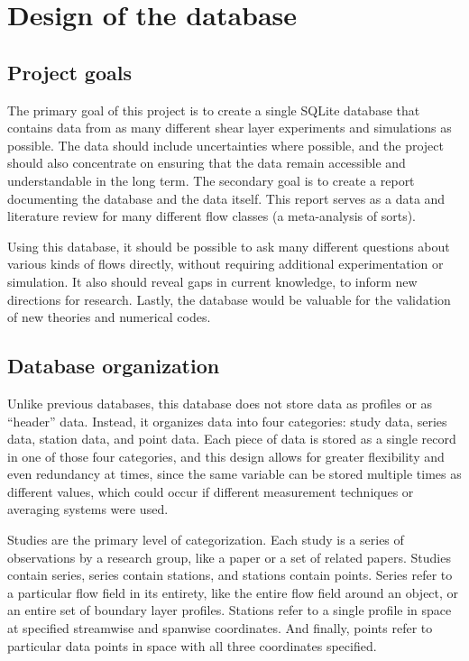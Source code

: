 %
\chapter{Design of the database}


\section{Project goals}

The primary goal of this project is to create a single SQLite database that
contains data from as many different shear layer experiments and simulations as
possible.  The data should include uncertainties where possible, and the
project should also concentrate on ensuring that the data remain accessible and
understandable in the long term.  The secondary goal is to create a report
documenting the database and the data itself.  This report serves as a data and
literature review for many different flow classes (a meta-analysis of sorts).

Using this database, it should be possible to ask many different questions
about various kinds of flows directly, without requiring additional
experimentation or simulation.  It also should reveal gaps in current
knowledge, to inform new directions for research.  Lastly, the database would
be valuable for the validation of new theories and numerical codes.


\section{Database organization}

Unlike previous databases, this database does not store data as profiles or as
``header'' data.  Instead, it organizes data into four categories: study data,
series data, station data, and point data.  Each piece of data is stored as a
single record in one of those four categories, and this design allows for
greater flexibility and even redundancy at times, since the same variable can
be stored multiple times as different values, which could occur if different
measurement techniques or averaging systems were used.

Studies are the primary level of categorization.  Each study is a series of
observations by a research group, like a paper or a set of related papers.
Studies contain series, series contain stations, and stations contain points.
Series refer to a particular flow field in its entirety, like the entire flow
field around an object, or an entire set of boundary layer profiles.  Stations
refer to a single profile in space at specified streamwise and spanwise
coordinates.  And finally, points refer to particular data points in space with
all three coordinates specified.

